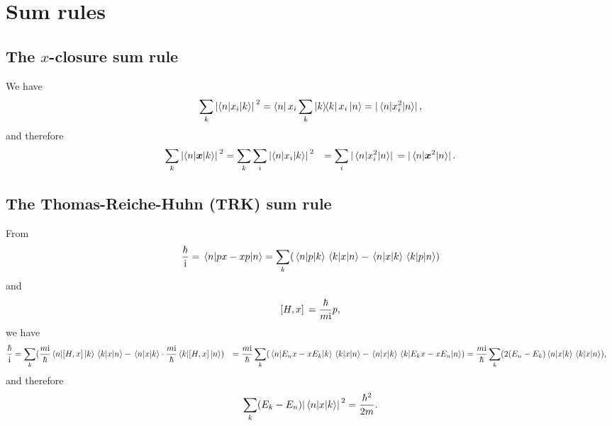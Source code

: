 \documentclass[hyperref, a4paper]{article}
\newcommand*{\ii}{\mathrm{i}}
\def\\{}%
\begin{document}
\section{Sum rules}

\subsection{The $x$-closure sum rule}

We have
\begin{equation}
    \sum_{k} \abs*{\mel**{n}{x_i}{k}}^2 = \bra{n} x_i \sum_k \dyad{k} x_i \ket*{n} = \abs*{\expval*{x_i^2}{n}},
\end{equation}
and therefore 
\begin{equation}
    \begin{aligned}
        \sum_{k} \abs*{\mel**{n}{\vb*{x}}{k}}^2 &=
        \sum_k \sum_i  \abs*{\mel**{n}{x_i}{k}}^2 \\
        &= \sum_i \abs*{\expval*{x_i^2}{n}} = \abs*{\expval*{\vb*{x}^2}{n}}.
    \end{aligned}
\end{equation}

\subsection{The Thomas-Reiche-Huhn (TRK) sum rule}

From 
\begin{equation}
    \frac{\hbar}{\ii} = \expval*{px - xp}{n} 
    = \sum_k (
        \mel{n}{p}{k} \mel{k}{x}{n}
        - \mel{n}{x}{k} \mel{k}{p}{n}
    )
\end{equation}
and 
\begin{equation}
    \comm*{H}{x} = \frac{\hbar}{m \ii}p,
\end{equation}
we have 
\[
    \begin{aligned}
        \frac{\hbar}{\ii} &= \sum_k (
            \frac{m \ii}{\hbar} \mel{n}{\comm*{H}{x}}{k} \mel{k}{x}{n}
            - \mel{n}{x}{k} \cdot \frac{m \ii}{\hbar} \mel{k}{\comm*{H}{x}}{n}
        ) \\
        &= \frac{m \ii}{\hbar} \sum_k (
            \mel{n}{E_n x - x E_k}{k} \mel{k}{x}{n}
            - \mel{n}{x}{k} \mel{k}{E_k x - x E_n}{n}
        ) \\
        &= \frac{m \ii}{\hbar} \sum_k (
            2 (E_n - E_k)  \mel{n}{x}{k} \mel{k}{x}{n}
        ) ,
    \end{aligned}
\]
and therefore
\begin{equation}
    \sum_k (E_k - E_n) \abs*{\mel{n}{x}{k}}^2 = \frac{\hbar^2}{2m}.
\end{equation}
\end{document}
